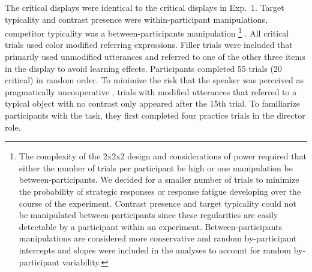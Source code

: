 \documentclass[10pt,letterpaper]{article}
\begin{document}
The critical displays were identical to the critical displays in Exp.~1. Target typicality and contrast presence were within-participant manipulations, competitor typicality was a between-participants manipulation
\footnote{The complexity of the 2x2x2 design and considerations of power required that either the number of trials per participant  be high or one manipulation  be between-participants. We decided for a smaller number of trials to minimize the probability of strategic responses or response fatigue developing over the course of the experiment. Contrast presence and target typicality could not be manipulated between-participants since these regularities are easily detectable by a participant within an experiment. Between-participants manipulations are considered more conservative \cite{Charness:2012} and random by-participant intercepts and slopes were included in the analyses to account for random by-participant variability.}
. All critical trials used color modified referring expressions. 
Filler trials were included that primarily used unmodified utterances and referred to one of the other three items in the display to avoid learning effects. 
Participants completed 55 trials (20 critical) in random order. To minimize the risk that the speaker was perceived as pragmatically uncooperative \cite{Grodner:2011,Pogue:2016,Ryskin:2019}, trials with modified utterances that referred to a typical object with no contrast only appeared after the 15th trial. To familiarize participants with the task, they first completed four practice trials in the director role.
 
 


\end{document}
